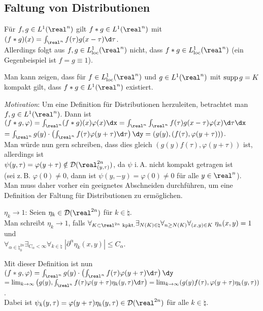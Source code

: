 \pagebreak

\subsection{%
    Faltung von Distributionen%
}

Für $f, g \in L^1(\real^n)$ gilt $f \ast g \in L^1(\real^n)$ mit
$(f \ast g)(x) = \int_{\real^n} f(\tau)g(x - \tau)\d\tau$.\\
Allerdings folgt aus $f, g \in L^1_\loc(\real^n)$ nicht, dass
$f \ast g \in L^1_\loc(\real^n)$
(ein Gegenbeispiel ist $f = g \equiv 1$).

Man kann zeigen, dass für $f \in L^1_\loc(\real^n)$ und $g \in L^1(\real^n)$
mit $\operatorname{supp} g = K$ kompakt gilt, dass $f \ast g \in L^1(\real^n)$ existiert.

\emph{Motivation}:
Um eine Definition für Distributionen herzuleiten, betrachtet man
$f, g \in L^1(\real^n)$.
Dann ist $(f \ast g, \varphi) = \int_{\real^n} (f \ast g)(x)\varphi(x)\dx =
\int_{\real^n} \int_{\real^n} f(\tau)g(x - \tau)\varphi(x)\d\tau \dx$\\
$= \int_{\real^n} g(y) \cdot
\left(\int_{\real^n} f(\tau)\varphi(y + \tau)\d\tau\right)\dy =
(g(y), (f(\tau), \varphi(y + \tau)))$.\\
Man würde nun gern schreiben, dass dies gleich
$(g(y) f(\tau), \varphi(y + \tau))$ ist, allerdings ist\\
$\psi(y, \tau) = \varphi(y + \tau) \notin \D(\real^{2n}_{(y,\tau)})$,
da $\psi$ i.\,A. nicht kompakt getragen ist\\
(sei z.\,B. $\varphi(0) \not= 0$, dann ist $\psi(y, -y) = \varphi(0) \not= 0$
für alle $y \in \real^n$).\\
Man muss daher vorher ein geeignetes Abschneiden durchführen, um
eine Definition der Faltung für Distributionen zu ermöglichen.

\textbf{$\eta_k \to 1$}:
Seien $\eta_k \in \D(\real^{2n})$ für $k \in \natural$.\\
Man schreibt $\eta_k \to 1$, falls
$\forall_{K \subset \real^{2n} \text{ kpkt.}} \exists_{N(K) \in \natural}
\forall_{n \ge N(K)} \forall_{(x, y) \in K}\; \eta_n(x, y) = 1$ und\\
$\forall_{\alpha \in \natural_0^{2n}} \exists_{C_\alpha < \infty}
\forall_{k \in \natural}\; |\partial^\alpha \eta_k(x, y)| \le C_\alpha$.

Mit dieser Definition ist nun
$(f \ast g, \varphi) = \int_{\real^n} g(y) \cdot
\left(\int_{\real^n} f(\tau)\varphi(y + \tau)\d\tau\right)\dy$\\
$= \lim_{k \to \infty} \left(g(y), \int_{\real^n}
f(\tau)\varphi(y + \tau)\eta_k(y, \tau)\d\tau\right) =
\lim_{k \to \infty} (g(y) f(\tau), \varphi(y + \tau)\eta_k(y, \tau))$.\\
Dabei ist
$\psi_k(y, \tau) = \varphi(y + \tau)\eta_k(y, \tau) \in \D(\real^{2n})$
für alle $k \in \natural$.

